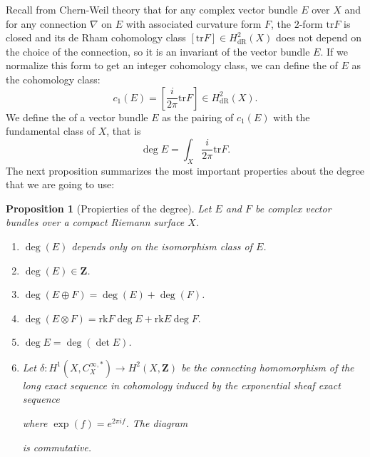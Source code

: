 \documentclass[12pt,a4paper]{book}
\newtheorem{prop}[thm]{Proposition}
\theoremstyle{definition} \newtheorem{defn}[thm]{Definition}
\theoremstyle{definition} \newtheorem{ejemplo}[thm]{Example}
\theoremstyle{remark} \newtheorem{rem}[thm]{Remark}
\def\ZZ{\mathbf{Z}}
\def\tr{\mathrm{tr}}
\def\rk{\mathrm{rk}}
\let\emph\relax
\begin{document}
Recall from Chern-Weil theory \cite{griffithsharris,wells} that for any complex vector bundle $E$ over $X$ and for any connection $\nabla$ on $E$ with associated curvature form $F$, the $2$-form $\tr F$ is closed and its de Rham cohomology class $[\tr F]\in H_{\mathrm{dR}}^2(X)$ does not depend on the choice of the connection, so it is an invariant of the vector bundle $E$. If we normalize this form to get an integer cohomology class, we can define the \emph{first Chern class} of $E$ as the cohomology class:
\begin{equation*}
  c_1(E)=\left[ \frac{i}{2\pi} \tr F \right] \in H_{\mathrm{dR}}^2(X).
\end{equation*}
We define the \emph{degree} of a vector bundle $E$ as the pairing of $c_1(E)$ with the fundamental class of $X$, that is
\begin{equation*}
  \deg E = \int_X\frac{i}{2\pi} \tr F. 
\end{equation*}
The next proposition \cite{wells} summarizes the most important properties about the degree that we are going to use:
\begin{prop}[Propierties of the degree]
  Let $E$ and $F$ be complex vector bundles over a compact Riemann surface $X$.
  \begin{enumerate}
    \item $\deg(E)$ depends only on the isomorphism class of $E$.
    \item $\deg(E) \in \mathbf{Z}$.
    \item $\deg(E\oplus F)=\deg(E)+ \deg(F)$.
    \item $\deg(E\otimes F)=\rk F \deg E + \rk E \deg F.$
    \item $\deg E=\deg(\det E) $.
    \item
      Let $\delta:H^1(X,C^{\infty,*}_X) \rightarrow H^2(X,\ZZ)$ be the connecting homomorphism of the long exact sequence in cohomology induced by the exponential sheaf exact sequence
      \begin{center}
       \end{center}
       where $\exp(f)=e^{2\pi if}$.
      The diagram
      \begin{center}
       \end{center}
       is commutative.
  \end{enumerate}
\end{prop}
\end{document}
